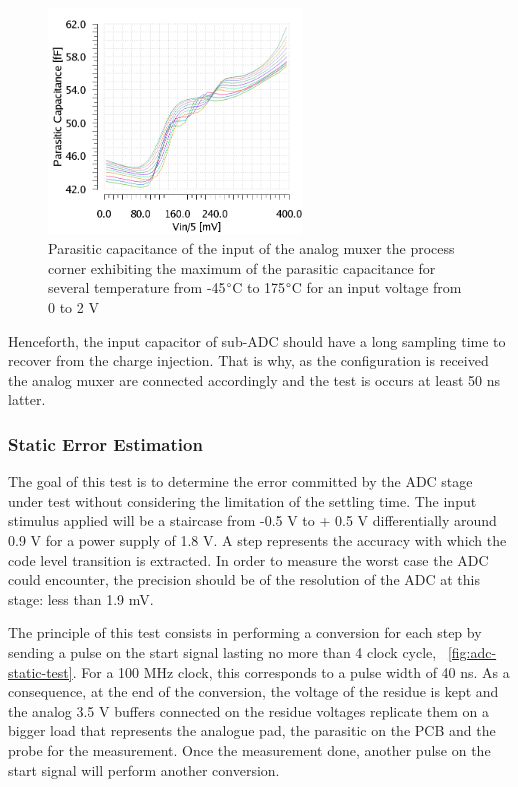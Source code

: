 \begin{figure}[htp]
    \centering
    \includegraphics[width=0.6\textwidth]{Chapter5/Figs/adc_chip/amux21-parasitic-ws-6s.png}
    \caption{Parasitic capacitance of the input of the analog muxer the process corner exhibiting the maximum of the parasitic capacitance for several temperature from -45$\degree$C to 175$\degree$C for an input voltage from 0 to 2 V}
    \label{fig:adc-with-test}
\end{figure}

Henceforth, the input capacitor of sub-ADC should have a long sampling time to recover from the charge injection. That is why, as the configuration is received the analog muxer are connected accordingly and the test is occurs at least 50 ns latter.

    \subsubsection{Static Error Estimation}
The goal of this test is to determine the error committed by the ADC stage under test without considering the limitation of the settling time. The input stimulus applied will be a staircase from -0.5 V to + 0.5 V differentially around 0.9 V for a power supply of 1.8 V. A step represents the accuracy with which the code level transition is extracted. In order to measure the worst case the ADC could encounter, the precision should be of the resolution of the ADC at this stage: less than 1.9 mV.

The principle of this test consists in performing a conversion for each step by sending a pulse on the start signal lasting no more than 4 clock cycle, \figurename~\ref{fig:adc-static-test}. For a 100 MHz clock, this corresponds to a pulse width of 40 ns. As a consequence, at the end of the conversion, the voltage of the residue is kept and the analog 3.5 V buffers connected on the residue voltages replicate them on a bigger load that represents the analogue pad, the parasitic on the PCB and the probe for the measurement. Once the measurement done, another pulse on the start signal will perform another conversion.

